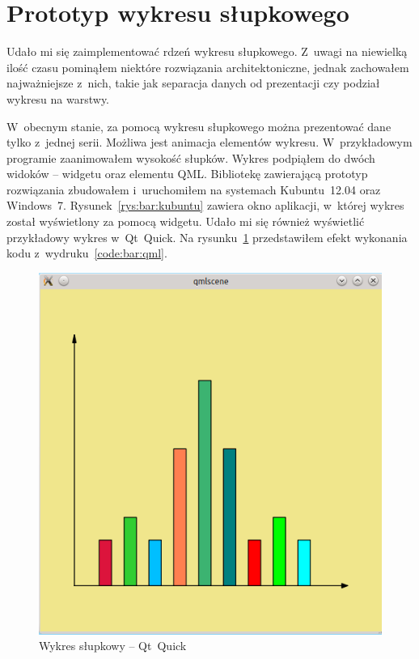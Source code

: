 \section{Prototyp wykresu słupkowego}
Udało mi się zaimplementować rdzeń wykresu słupkowego. Z~uwagi na niewielką ilość czasu pominąłem niektóre rozwiązania architektoniczne, jednak zachowałem najważniejsze z~nich, takie jak separacja danych od prezentacji czy podział wykresu na warstwy. 

W~obecnym stanie, za pomocą wykresu słupkowego można prezentować dane tylko z~jednej serii. Możliwa jest animacja elementów wykresu. W~przykładowym programie zaanimowałem wysokość słupków. Wykres podpiąłem do dwóch widoków -- widgetu oraz elementu QML. Bibliotekę zawierającą prototyp rozwiązania zbudowałem i~uruchomiłem na systemach Kubuntu~12.04 oraz Windows~7. Rysunek~\ref{rys:bar:kubuntu} zawiera okno aplikacji, w~której wykres został wyświetlony za pomocą widgetu. Udało mi się również wyświetlić przykładowy wykres w~Qt~Quick. Na rysunku~\ref{rys:bar:qml} przedstawiłem efekt wykonania kodu z~wydruku~\ref{code:bar:qml}.

\begin{figure}[H]
\centering
\includegraphics[scale=0.7]{img/BarChart_qml.png}
\caption{Wykres słupkowy -- Qt~Quick}\label{rys:bar:qml}
\end{figure}


